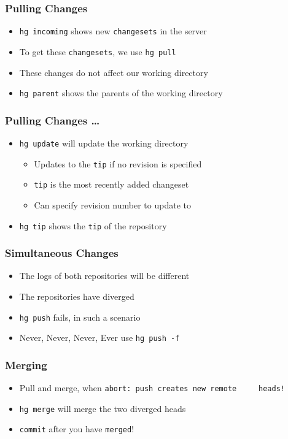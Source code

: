 \documentclass[12pt,compress]{beamer}
\newcommand{\typ}[1]{\lstinline{#1}}
\begin{document}
\begin{frame}
  \frametitle{Pulling Changes}
  \begin{itemize}
  \item \typ{hg incoming} shows new \typ{changesets} in the server 
  \item To get these \typ{changesets}, we use \typ{hg pull}
  \item These changes do not affect our working directory
  \item \typ{hg parent} shows the parents of the working directory
  \end{itemize}
\end{frame}

\begin{frame}
  \frametitle{Pulling Changes \ldots}
  \begin{itemize}
  \item \typ{hg update} will update the working directory 
    \begin{itemize}
    \item Updates to the \typ{tip} if no revision is specified
    \item \typ{tip} is the most recently added changeset 
    \item Can specify revision number to update to
    \end{itemize}
  \item \typ{hg tip} shows the \typ{tip} of the repository
  \end{itemize}
\end{frame}

\begin{frame}
  \frametitle{Simultaneous Changes}
  \begin{itemize}
  \item The logs of both repositories will be different
  \item The repositories have diverged
  \item \typ{hg push} fails, in such a scenario
  \item \alert{Never, Never, Never, Ever} use \typ{hg push -f}
  \end{itemize}
\end{frame}

\begin{frame}
  \frametitle{Merging}
  \begin{itemize}
  \item Pull and merge, when \typ{abort: push creates new remote
    heads!}
  \item \typ{hg merge} will merge the two diverged heads
  \item \typ{commit} after you have \typ{merged}!
  \end{itemize}
\end{frame}
\end{document}
